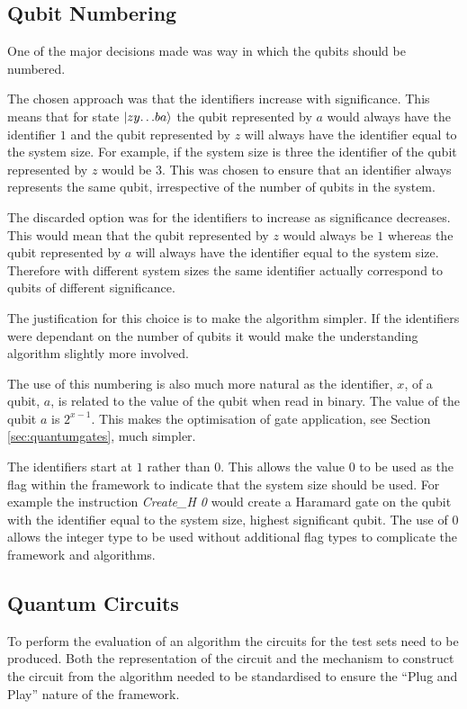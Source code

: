 \subsection{Qubit Numbering}
\label{sec:qubitnum}
One of the major decisions made was way in which the qubits should be numbered.

The chosen approach was that the identifiers increase with significance.
This means that for state $\left\vert{zy{\dots}ba}\right\rangle$ the qubit represented by $a$ would always have the identifier $1$ and the qubit represented by $z$ will always have the identifier equal to the system size.
For example, if the system size is three the identifier of the qubit represented by $z$ would be $3$.
This was chosen to ensure that an identifier always represents the same qubit, irrespective of the number of qubits in the system.

The discarded option was for the identifiers to increase as significance decreases.
This would mean that the qubit represented by $z$ would always be $1$ whereas the qubit represented by $a$ will always have the identifier equal to the system size.
Therefore with different system sizes the same identifier actually correspond to qubits of different  significance.

The justification for this choice is to make the algorithm simpler.
If the identifiers were dependant on the number of qubits it would make the understanding algorithm slightly more involved.

The use of this numbering is also much more natural as the identifier, $x$, of a qubit, $a$, is related to the value of the qubit when read in binary.
The value of the qubit $a$ is $2^{x-1}$.
This makes the optimisation of gate application, see Section \ref{sec:quantumgates}, much simpler.

The identifiers start at $1$ rather than $0$.
This allows the value $0$ to be used as the flag within the framework to indicate that the system size should be used.
For example the instruction \emph{Create\_H 0} would create a Haramard gate on the qubit with the identifier equal to the system size, highest significant qubit.
The use of $0$ allows the integer type to be used without additional flag types to complicate the framework and algorithms.

\subsection{Quantum Circuits}
\label{sec:quantumcircuits}
To perform the evaluation of an algorithm the circuits for the test sets need to be produced.
Both the representation of the circuit and the mechanism to construct the circuit from the algorithm needed to be standardised to ensure the ``Plug and Play'' nature of the framework.

